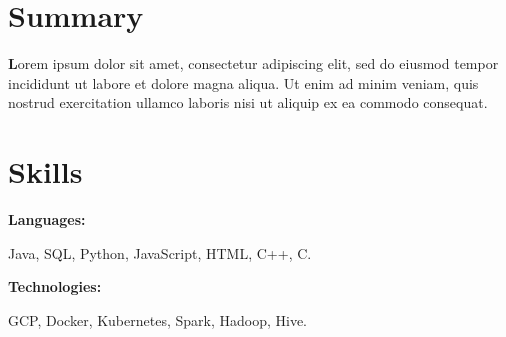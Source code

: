 \documentclass[letterpaper,9pt]{article}
\begin{document}
    \begin{minipage}[t]{0.46\textwidth}
    \section{\textbf{Summary}}
	\textbf Lorem ipsum dolor sit amet, consectetur adipiscing elit, sed do eiusmod tempor incididunt ut labore et dolore magna aliqua. 
    Ut enim ad minim veniam, quis nostrud exercitation ullamco laboris nisi ut aliquip ex ea commodo consequat.  \\
\end{minipage}
    \hfill
\begin{minipage}[t]{0.48\textwidth}
\section{\textbf{Skills}}
    
    
    \begin{minipage}[t]{0.2\textwidth}
        \textbf{Languages:}
    \end{minipage}
    \hfill
    \begin{minipage}[t]{0.73\textwidth}
      Java, SQL, Python, JavaScript, HTML, C++, C.  
    \end{minipage}
    \vspace{4mm}
    
    \begin{minipage}[t]{0.2\textwidth}
        \textbf{Technologies:}
    \end{minipage}
    \hfill
    \begin{minipage}[t]{0.73\textwidth}
      GCP, Docker, Kubernetes, Spark, Hadoop, Hive.
    \end{minipage}
    
\end{minipage}
    
\end{document}
